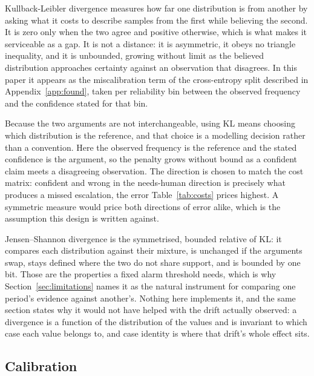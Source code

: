 \documentclass{article}
\begin{document}
Kullback-Leibler divergence measures how far one distribution is from another by asking
what it costs to describe samples from the first while believing the second. It is zero
only when the two agree and positive otherwise, which is what makes it serviceable as a
gap. It is not a distance: it is asymmetric, it obeys no triangle inequality, and it is
unbounded, growing without limit as the believed distribution approaches certainty
against an observation that disagrees. In this paper it appears as the miscalibration
term of the cross-entropy split described in Appendix~\ref{app:found}, taken per
reliability bin between the observed frequency and the confidence stated for that bin.

Because the two arguments are not interchangeable, using KL means choosing which
distribution is the reference, and that choice is a modelling decision rather than a
convention. Here the observed frequency is the reference and the stated confidence is
the argument, so the penalty grows without bound as a confident claim meets a
disagreeing observation. The direction is chosen to match the cost matrix: confident
and wrong in the needs-human direction is precisely what produces a missed escalation,
the error Table~\ref{tab:costs} prices highest. A symmetric measure would price both
directions of error alike, which is the assumption this design is written against.

Jensen--Shannon divergence is the symmetrised, bounded relative of KL: it compares each
distribution against their mixture, is unchanged if the arguments swap, stays defined
where the two do not share support, and is bounded by one bit. Those are the properties
a fixed alarm threshold needs, which is why Section~\ref{sec:limitations} names it as
the natural instrument for comparing one period's evidence against another's. Nothing
here implements it, and the same section states why it would not have helped with the
drift actually observed: a divergence is a function of the distribution of the values
and is invariant to which case each value belongs to, and case identity is where that
drift's whole effect sits.

\subsection{Calibration}
\end{document}
